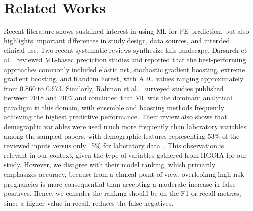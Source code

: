 \documentclass[diagnostics,article,accept,pdftex,moreauthors]{Definitions/mdpi}
\begin{document}
\section{Related Works}
\label{sec:related-works}
Recent literature shows sustained interest in using \ac{ML} for
\ac{PE} prediction, but also highlights important differences in
study design, data sources, and intended clinical use. Two recent
systematic reviews synthesize this landscape. Darsareh et
al.~\cite{Darsareh2024} reviewed \ac{ML}-based prediction studies and
reported that the best-performing approaches commonly included elastic
net, stochastic gradient boosting, extreme gradient boosting, and
Random Forest, with \ac{AUC} values ranging approximately from 0.860 to
0.973. Similarly, Rahman et al.~\cite{Rahman2023} surveyed studies
published between 2018 and 2022 and concluded that \ac{ML} was the
dominant analytical paradigm in this domain, with ensemble and
boosting methods frequently achieving the highest predictive
performance. Their review also shows that demographic variables were
used much more frequently than laboratory variables among the sampled
papers, with demographic features representing 53\% of the reviewed
inputs versus only 15\% for laboratory data~\cite{Rahman2023}. This
observation is relevant in our context, given the type of variables
gathered from \ac{HGOIA} for our study. However, we
disagree with their model ranking, which primarily emphasizes
accuracy, because from a clinical point of view, overlooking high-risk
pregnancies is more consequential than accepting a moderate increase
in false positives. Hence, we consider the ranking should be on the
\ac{F1} or recall metrics, since a higher value in recall, reduces the
false negatives.
\end{document}
